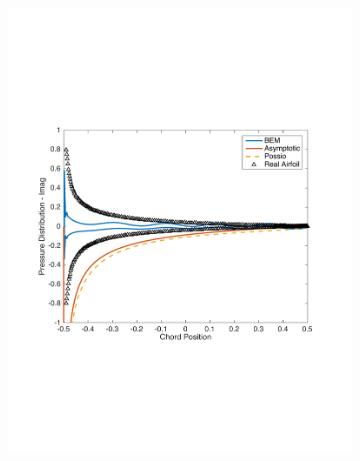 \documentclass{article}
\begin{document}
\begin{figure}[h]
\begin{subfigure}{0.3\textwidth}
	\includegraphics[width = \textwidth, height=0.2\textheight]{pressure_k15imag}
\end{subfigure}%
\begin{subfigure}{0.33\textwidth}
	\centering

\end{subfigure}
\end{figure}
\end{document}

